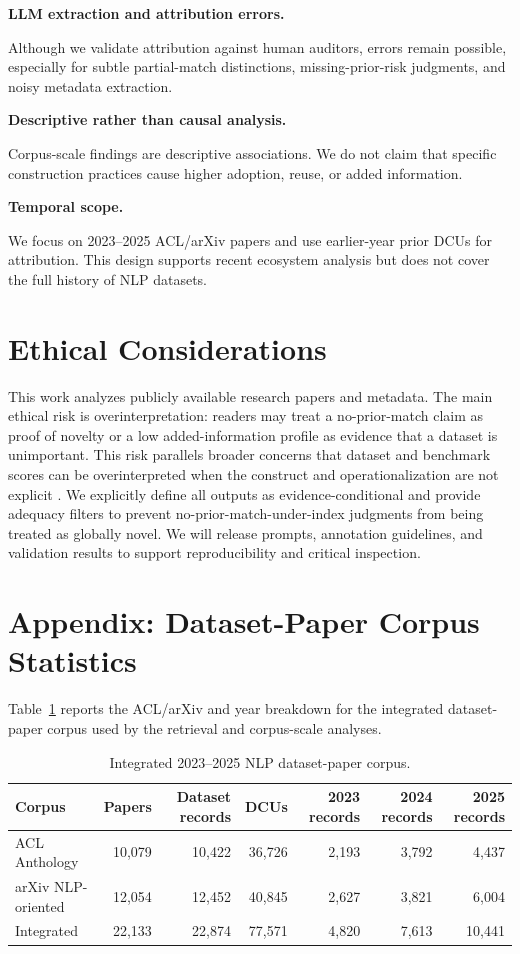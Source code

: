 \documentclass[11pt]{article}
\begin{document}
\smallskip\noindent\textbf{LLM extraction and attribution errors.}\par\noindent
Although we validate attribution against human auditors, errors remain possible, especially for subtle partial-match distinctions, missing-prior-risk judgments, and noisy metadata extraction.

\smallskip\noindent\textbf{Descriptive rather than causal analysis.}\par\noindent
Corpus-scale findings are descriptive associations.
We do not claim that specific construction practices cause higher adoption, reuse, or added information.

\smallskip\noindent\textbf{Temporal scope.}\par\noindent
We focus on 2023--2025 ACL/arXiv papers and use earlier-year prior DCUs for attribution.
This design supports recent ecosystem analysis but does not cover the full history of NLP datasets.
\section{Ethical Considerations}
This work analyzes publicly available research papers and metadata.
The main ethical risk is overinterpretation: readers may treat a no-prior-match claim as proof of novelty or a low added-information profile as evidence that a dataset is unimportant.
This risk parallels broader concerns that dataset and benchmark scores can be overinterpreted when the construct and operationalization are not explicit \citep{raji2021benchmark,zhao2024measure,bean2025construct}.
We explicitly define all outputs as evidence-conditional and provide adequacy filters to prevent no-prior-match-under-index judgments from being treated as globally novel.
We will release prompts, annotation guidelines, and validation results to support reproducibility and critical inspection.

\clearpage
\appendix
\section{Appendix: Dataset-Paper Corpus Statistics}
\label{app:corpus_stats}

Table~\ref{tab:corpus_stats} reports the ACL/arXiv and year breakdown for the integrated dataset-paper corpus used by the retrieval and corpus-scale analyses.
\begin{table}[h]
\centering
\small
\begin{tabular}{lrrrrrr}
\toprule
Corpus & Papers & Dataset records & DCUs & 2023 records & 2024 records & 2025 records \\
\midrule
ACL Anthology & 10,079 & 10,422 & 36,726 & 2,193 & 3,792 & 4,437 \\
arXiv NLP-oriented & 12,054 & 12,452 & 40,845 & 2,627 & 3,821 & 6,004 \\
Integrated & 22,133 & 22,874 & 77,571 & 4,820 & 7,613 & 10,441 \\
\bottomrule
\end{tabular}
\caption{Integrated 2023--2025 NLP dataset-paper corpus.}
\label{tab:corpus_stats}
\end{table}
\end{document}
